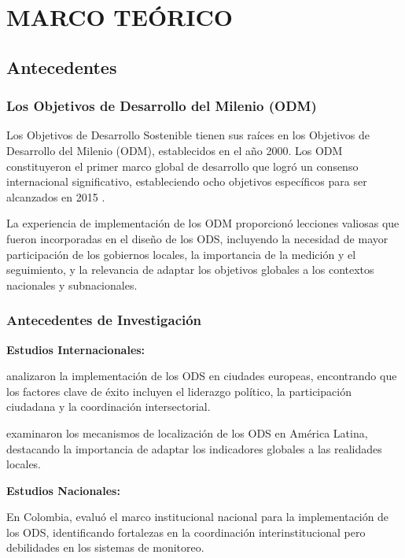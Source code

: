 \section{MARCO TEÓRICO}

\subsection{Antecedentes}

\subsubsection{Los Objetivos de Desarrollo del Milenio (ODM)}

Los Objetivos de Desarrollo Sostenible tienen sus raíces en los Objetivos de Desarrollo del Milenio (ODM), establecidos en el año 2000. Los ODM constituyeron el primer marco global de desarrollo que logró un consenso internacional significativo, estableciendo ocho objetivos específicos para ser alcanzados en 2015 \citep{naciones_unidas_2000}.

La experiencia de implementación de los ODM proporcionó lecciones valiosas que fueron incorporadas en el diseño de los ODS, incluyendo la necesidad de mayor participación de los gobiernos locales, la importancia de la medición y el seguimiento, y la relevancia de adaptar los objetivos globales a los contextos nacionales y subnacionales.

\subsubsection{Antecedentes de Investigación}

\textbf{Estudios Internacionales:}

\citet{autor_ejemplo_2020} analizaron la implementación de los ODS en ciudades europeas, encontrando que los factores clave de éxito incluyen el liderazgo político, la participación ciudadana y la coordinación intersectorial.

\citet{otro_autor_2019} examinaron los mecanismos de localización de los ODS en América Latina, destacando la importancia de adaptar los indicadores globales a las realidades locales.

\textbf{Estudios Nacionales:}

En Colombia, \citet{investigador_colombiano_2021} evaluó el marco institucional nacional para la implementación de los ODS, identificando fortalezas en la coordinación interinstitucional pero debilidades en los sistemas de monitoreo.

